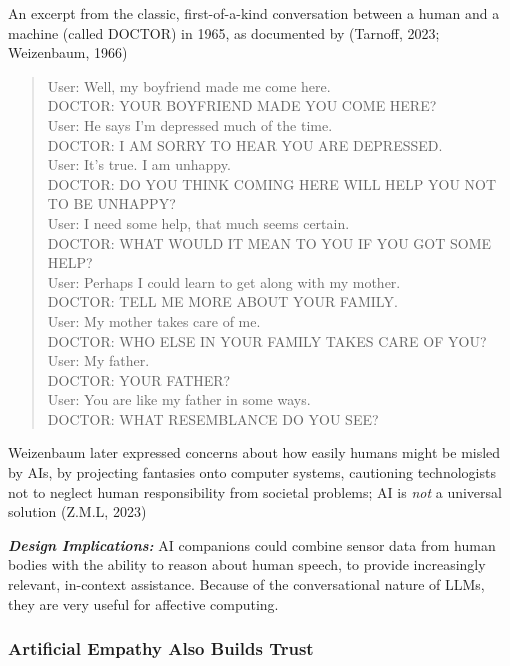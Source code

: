\documentclass[
  letterpaper,
  DIV=11,
  numbers=noendperiod]{scrartcl}
\begin{document}
An excerpt from the classic, first-of-a-kind conversation between a
human and a machine (called DOCTOR) in 1965, as documented by (Tarnoff,
2023; Weizenbaum, 1966)

\begin{quote}
User: Well, my boyfriend made me come here.\\
DOCTOR: YOUR BOYFRIEND MADE YOU COME HERE?\\
User: He says I'm depressed much of the time.\\
DOCTOR: I AM SORRY TO HEAR YOU ARE DEPRESSED.\\
User: It's true. I am unhappy.\\
DOCTOR: DO YOU THINK COMING HERE WILL HELP YOU NOT TO BE UNHAPPY?\\
User: I need some help, that much seems certain.\\
DOCTOR: WHAT WOULD IT MEAN TO YOU IF YOU GOT SOME HELP?\\
User: Perhaps I could learn to get along with my mother.\\
DOCTOR: TELL ME MORE ABOUT YOUR FAMILY.\\
User: My mother takes care of me.\\
DOCTOR: WHO ELSE IN YOUR FAMILY TAKES CARE OF YOU?\\
User: My father.\\
DOCTOR: YOUR FATHER?\\
User: You are like my father in some ways.\\
DOCTOR: WHAT RESEMBLANCE DO YOU SEE?
\end{quote}

Weizenbaum later expressed concerns about how easily humans might be
misled by AIs, by projecting fantasies onto computer systems, cautioning
technologists not to neglect human responsibility from societal
problems; AI is \emph{not} a universal solution (Z.M.L, 2023)

\textbf{\emph{Design Implications:}} AI companions could combine sensor
data from human bodies with the ability to reason about human speech, to
provide increasingly relevant, in-context assistance. Because of the
conversational nature of LLMs, they are very useful for affective
computing.

\subsubsection{Artificial Empathy Also Builds
Trust}\label{artificial-empathy-also-builds-trust}
\end{document}
